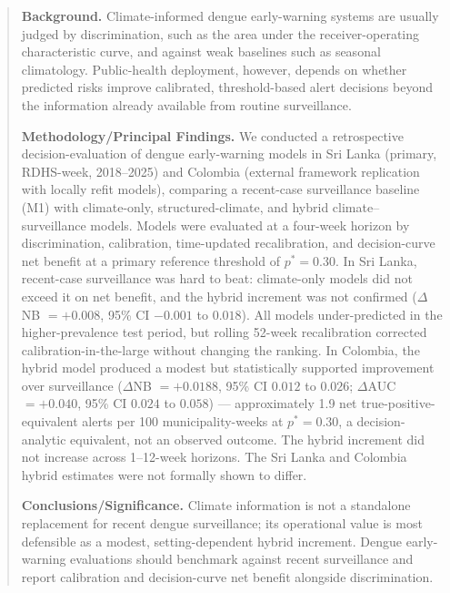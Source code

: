 \documentclass[11pt,a4paper]{article}
\begin{document}
\begin{abstract}
\noindent\textbf{Background.}
Climate-informed dengue early-warning systems are usually judged by discrimination, such as the area under the receiver-operating characteristic curve, and against weak baselines such as seasonal climatology. Public-health deployment, however, depends on whether predicted risks improve calibrated, threshold-based alert decisions beyond the information already available from routine surveillance.

\noindent\textbf{Methodology/Principal Findings.}
We conducted a retrospective decision-evaluation of dengue early-warning models in Sri Lanka (primary, RDHS-week, 2018--2025) and Colombia (external framework replication with locally refit models), comparing a recent-case surveillance baseline (M1) with climate-only, structured-climate, and hybrid climate--surveillance models. Models were evaluated at a four-week horizon by discrimination, calibration, time-updated recalibration, and decision-curve net benefit at a primary reference threshold of $p^*=0.30$. In Sri Lanka, recent-case surveillance was hard to beat: climate-only models did not exceed it on net benefit, and the hybrid increment was not confirmed ($\Delta$NB $=+0.008$, 95\% CI $-0.001$ to $0.018$). All models under-predicted in the higher-prevalence test period, but rolling 52-week recalibration corrected calibration-in-the-large without changing the ranking. In Colombia, the hybrid model produced a modest but statistically supported improvement over surveillance ($\Delta$NB $=+0.0188$, 95\% CI $0.012$ to $0.026$; $\Delta$AUC $=+0.040$, 95\% CI $0.024$ to $0.058$) --- approximately 1.9 net true-positive-equivalent alerts per 100 municipality-weeks at $p^*=0.30$, a decision-analytic equivalent, not an observed outcome. The hybrid increment did not increase across 1--12-week horizons. The Sri Lanka and Colombia hybrid estimates were not formally shown to differ.

\noindent\textbf{Conclusions/Significance.}
Climate information is not a standalone replacement for recent dengue surveillance; its operational value is most defensible as a modest, setting-dependent hybrid increment. Dengue early-warning evaluations should benchmark against recent surveillance and report calibration and decision-curve net benefit alongside discrimination.
\end{abstract}
\end{document}
